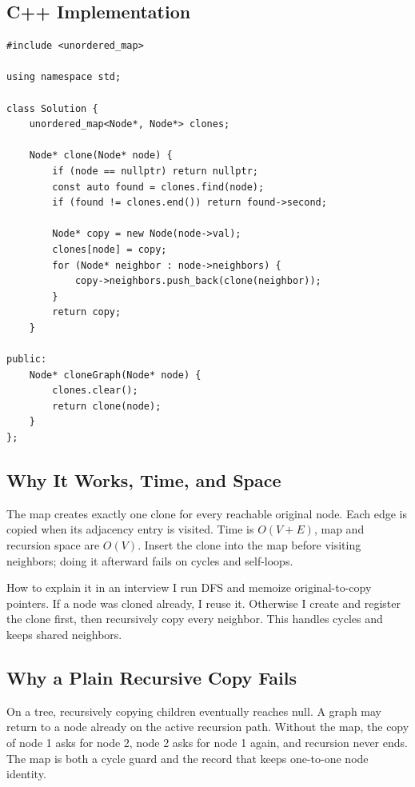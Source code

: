 \subsection{C++ Implementation}
\begin{lstlisting}[style=compactcode,caption={Complete C++ solution: Clone Graph}]
#include <unordered_map>

using namespace std;

class Solution {
    unordered_map<Node*, Node*> clones;

    Node* clone(Node* node) {
        if (node == nullptr) return nullptr;
        const auto found = clones.find(node);
        if (found != clones.end()) return found->second;

        Node* copy = new Node(node->val);
        clones[node] = copy;
        for (Node* neighbor : node->neighbors) {
            copy->neighbors.push_back(clone(neighbor));
        }
        return copy;
    }

public:
    Node* cloneGraph(Node* node) {
        clones.clear();
        return clone(node);
    }
};
\end{lstlisting}

\subsection{Why It Works, Time, and Space}
The map creates exactly one clone for every reachable original node. Each edge
is copied when its adjacency entry is visited. Time is \(O(V+E)\), map and
recursion space are \(O(V)\). Insert the clone into the map before visiting
neighbors; doing it afterward fails on cycles and self-loops.

\begin{revisionbox}{How to explain it in an interview}
I run DFS and memoize original-to-copy pointers. If a node was cloned already,
I reuse it. Otherwise I create and register the clone first, then recursively
copy every neighbor. This handles cycles and keeps shared neighbors.
\end{revisionbox}

\subsection{Why a Plain Recursive Copy Fails}
On a tree, recursively copying children eventually reaches null. A graph may
return to a node already on the active recursion path. Without the map, the
copy of node 1 asks for node 2, node 2 asks for node 1 again, and recursion
never ends. The map is both a cycle guard and the record that
keeps one-to-one node identity.

